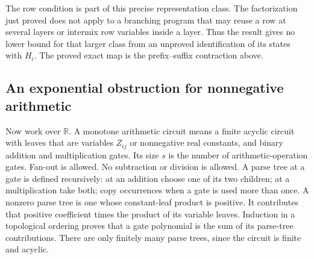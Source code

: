 The row condition is part of this precise representation class.
The factorization just proved does not apply to a branching program
that may reuse a row at several layers or intermix row variables
inside a layer. Thus the result gives no lower bound for that larger
class from an unproved identification of its states with $H_i$.
The proved exact map is the prefix--suffix contraction above.

\subsection{An exponential obstruction for nonnegative arithmetic}

Now work over $\mathbb R$. A monotone arithmetic circuit means a
finite acyclic circuit with leaves that are variables $Z_{ij}$ or
nonnegative real constants, and binary addition and multiplication
gates. Its size $s$ is the number of arithmetic-operation gates.
Fan-out is allowed. No subtraction or division is allowed. A parse
tree at a gate is defined recursively: at an addition choose one
of its two children; at a multiplication take both; copy occurrences
when a gate is used more than once. A nonzero parse tree is one
whose constant-leaf product is positive. It contributes that positive
coefficient times the product of its variable leaves.
Induction in a topological ordering proves that a gate polynomial
is the sum of its parse-tree contributions. There are only finitely
many parse trees, since the circuit is finite and acyclic.

